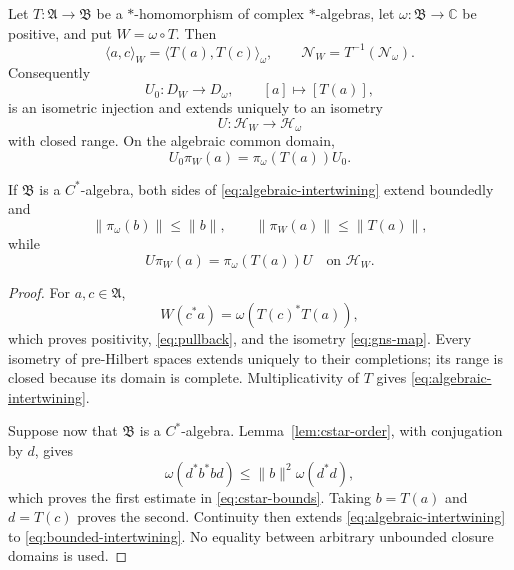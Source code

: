 \documentclass[11pt]{article}
\numberwithin{equation}{section}
\newcommand{\cN}{\mathcal N}
\newcommand{\C}{\mathbb C}
\begin{document}
\begin{theorem}
\label{thm:dagger}
Let $T:\mathfrak A\to\mathfrak B$ be a $*$-homomorphism of complex
$*$-algebras, let $\omega:\mathfrak B\to\C$ be positive, and put
$W=\omega\circ T$.  Then
\begin{equation}
 \langle a,c\rangle_W
 =\langle T(a),T(c)\rangle_\omega,
 \qquad
 \cN_W=T^{-1}(\cN_\omega).
 \label{eq:pullback}
\end{equation}
Consequently
\begin{equation}
 U_0:D_W\longrightarrow D_\omega,
 \qquad [a]\longmapsto[T(a)],
 \label{eq:gns-map}
\end{equation}
is an isometric injection and extends uniquely to an isometry
\begin{equation}
 U:\mathcal H_W\longrightarrow\mathcal H_\omega
 \label{eq:completion-map}
\end{equation}
with closed range.  On the algebraic common domain,
\begin{equation}
 U_0\pi_W(a)=\pi_\omega(T(a))U_0.
 \label{eq:algebraic-intertwining}
\end{equation}

If $\mathfrak B$ is a $C^*$-algebra, both sides of
\eqref{eq:algebraic-intertwining} extend boundedly and
\begin{equation}
 \|\pi_\omega(b)\|\leq\|b\|,
 \qquad
 \|\pi_W(a)\|\leq\|T(a)\|,
 \label{eq:cstar-bounds}
\end{equation}
while
\begin{equation}
 U\pi_W(a)=\pi_\omega(T(a))U
 \quad\text{on }\mathcal H_W.
 \label{eq:bounded-intertwining}
\end{equation}
\end{theorem}

\begin{proof}
For $a,c\in\mathfrak A$,
\[
 W(c^*a)=\omega(T(c)^*T(a)),
\]
which proves positivity, \eqref{eq:pullback}, and the isometry
\eqref{eq:gns-map}.  Every isometry of pre-Hilbert spaces extends
uniquely to their completions; its range is closed because its domain is
complete.  Multiplicativity of $T$ gives
\eqref{eq:algebraic-intertwining}.

Suppose now that $\mathfrak B$ is a $C^*$-algebra.  Lemma~\ref{lem:cstar-order}, with conjugation by $d$, gives
\[
 \omega(d^*b^*bd)\leq\|b\|^2\omega(d^*d),
\]
which proves the first estimate in \eqref{eq:cstar-bounds}.  Taking
$b=T(a)$ and $d=T(c)$ proves the second.  Continuity then extends
\eqref{eq:algebraic-intertwining} to
\eqref{eq:bounded-intertwining}.  No equality between arbitrary
unbounded closure domains is used.
\end{proof}
\end{document}
